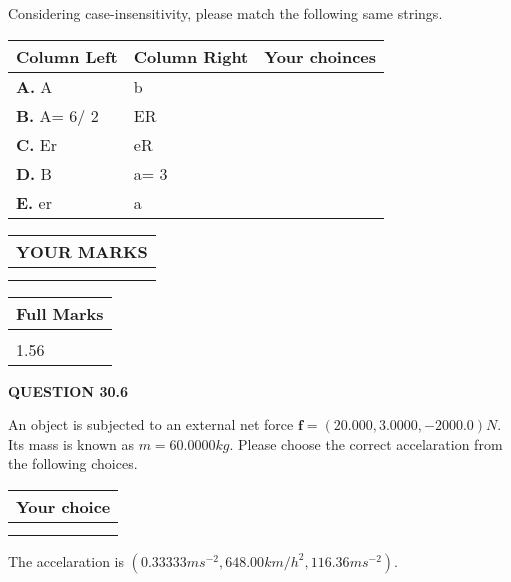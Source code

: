 \documentclass[12pt]{article}
\begin{document}
  
Considering case-insensitivity, please match the following same strings.
  
  
\begin{tabular}{|l|l|l|}
 \hline
 Column Left & Column Right  & Your choinces \\ 
 \hline
{\textbf{\large{
A.}}}
A
  & 
b
 & 
 \\ 
 \hline
{\textbf{\large{
B.}}}
 A= %
6/ %
2

  & 
ER
 & 
 \\ 
 \hline
{\textbf{\large{
C.}}}
Er
  & 
eR
 & 
 \\ 
 \hline
{\textbf{\large{
D.}}}
B
  & 
 a= %
3
 & 
 \\ 
 \hline
{\textbf{\large{
E.}}}
er
  & 
a
 & 
 \\ 
 \hline
 \end{tabular}
  
  
 
  
\vspace{0.2in}
  
\noindent\begin{tabular}{|l|}
\hline
 YOUR MARKS  \\
\hline
 \\ 
 \\ 
\hline
\end{tabular}
\hspace{0.05in} \begin{tabular}{|l|}
\hline
 Full Marks  \\
\hline
 \\ 
1.56 \\
\hline
\end{tabular}
{\textbf{\Large{QUESTION
30.6 
}}}
  
  
 
An object is subjected to an external net force $\mathbf{f}=(
20.000 ,
3.0000,
-2000.0  )N$. Its mass is known as
$m= %
60.0000  kg$. Please choose the correct accelaration
from the following choices.
 
  
  
\noindent\hspace{3.0in} \begin{tabular}{|l|}
\hline
Your choice \\
\hline
 \\ 
 \\ 
\hline
\end{tabular}
  
  
 
 
The accelaration is
$(
0.33333ms^{-2},
648.00km/h^2,
116.36ms^{-2}
).
$
 
\end{document}
